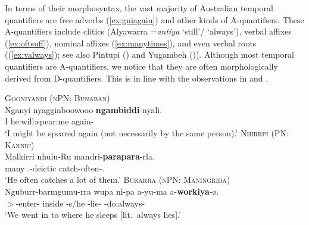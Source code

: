 \documentclass[12pt,egregdoesnotlikesansseriftitles]{scrartcl}
\begin{document}
In terms of their morphosyntax, the vast majority of Australian temporal quantifiers are free adverbs (\ref{ex:gniagain}) and other kinds of A-quantifiers. These A-quantifiers include clitics (Alyawarra =\textit{antiya} `still'/ `always'), verbal affixes (\ref{ex:oftsuff}), %
nominal affixes (\ref{ex:manytimes}), and even verbal roots ((\ref{ex:valways}); see also Pintupi () and Yugambeh ()). Although most temporal quantifiers are A-quantifiers, we notice that they are often morphologically derived from D-quantifiers. This is in line with the observations in \cite{gil93} and \cite{keenanpaperno17ov}.
\begin{exe}
  \ex\label{ex:gniagain} \textsc{Gooniyandi (nPN: Bunaban)}\hfill {}\\
  \gll Nganyi nyagginboowooo \textbf{ngambiddi}-nyali.\\
  I he:will:spear:me again-\Rep\\
  \glt `I might be speared again (not necessarily by the same person).'
  \ex\label{ex:oftsuff} \textsc{Nhirrpi (PN: Karnic)}\hfill {}\\
  \gll Malkirri nhulu-Ru mandri-\textbf{parapara}-rla.\\
  many \Tsg.\Erg-deictic catch-often-\Prs.\Prog\\
  \glt `He often catches a lot of them.'
  \ex\label{ex:valways} \textsc{Burarra (nPN: Maningrida)}\hfill {}\\
  \gll Nguburr-barmgumu-rra wupa ni-pa a-yu-ma a-\textbf{workiya}-ø.\\
  \First$>$\Second\Aug-enter-\Pc{} inside \Third\Min-s/he  \Third\Min-lie-\Ctp{} \Third\Min-do:always-\Ctp\\
  \glt `We went in to where he sleeps [lit.\ always lies].'
\end{exe}
\end{document}
